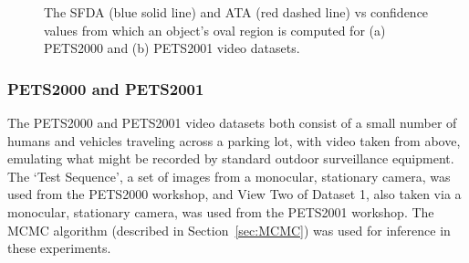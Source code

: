 \documentclass[twocolumn, final]{svjour3}
\begin{document}
\begin{figure}[!]
  \centering             
   \hspace{1mm}
  \caption{The SFDA (blue solid line) and ATA (red dashed line) vs  confidence values from which an object's oval region is computed for (a) PETS2000 and (b) PETS2001 video datasets.}
  \label{fig:pm_conf}
\end{figure}


\subsubsection{PETS2000 and PETS2001}
\label{sec:pets2000and2001}

The PETS2000 and PETS2001 video datasets both consist of a small number of humans and vehicles traveling across a parking lot, with video taken from above, emulating what might be recorded by standard outdoor surveillance equipment. The `Test Sequence', a set of images from a monocular, stationary camera, was used from the PETS2000 workshop, and View Two of Dataset 1, also taken via a monocular, stationary camera, was used from the PETS2001 workshop. The MCMC algorithm (described in Section~\ref{sec:MCMC}) was used for inference in these experiments.
\end{document}
